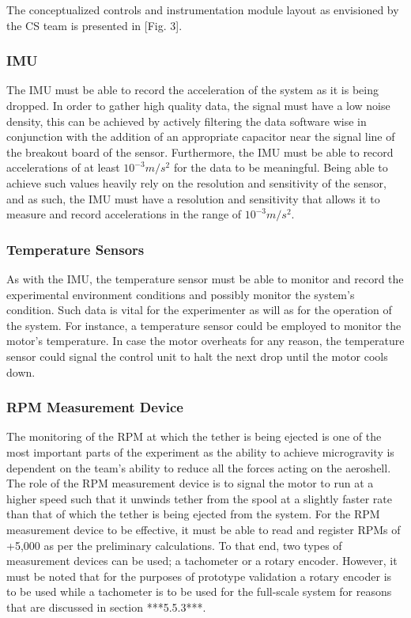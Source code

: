 The conceptualized controls and instrumentation module layout as envisioned by the CS team is presented in [Fig. 3].

\subsubsection{IMU}

\indent\indent The IMU must be able to record the acceleration of the system as it is being dropped. In order to gather high quality data, the signal must have a low noise density, this can be achieved by actively filtering the data software wise in conjunction with the addition of an appropriate capacitor near the signal line of the breakout board of the sensor. Furthermore, the IMU must be able to record accelerations of at least $10^{−3} m/s^{2}$ for the data to be meaningful. Being able to achieve such values heavily rely on the resolution and sensitivity of the sensor, and as such, the IMU must have a resolution and sensitivity that allows it to measure and record accelerations in the range of $10^{−3} m/s^{2}$.

\subsubsection{Temperature Sensors}
\indent\indent As with the IMU, the temperature sensor must be able to monitor and record the experimental environment conditions and possibly monitor the system’s condition. Such data is vital for the experimenter as will as for the operation of the system. For instance, a temperature sensor could be employed to monitor the motor’s temperature. In case the motor overheats for any reason, the temperature sensor could signal the control unit to halt the next drop until the motor cools down.

\subsubsection{RPM Measurement Device}

\indent\indent The monitoring of the RPM at which the tether is being ejected is one of the most important parts of the experiment as the ability to achieve microgravity is dependent on the team’s ability to reduce all the forces acting on the aeroshell. The role of the RPM measurement device is to signal the motor to run at a higher speed such that it unwinds tether from the spool at a slightly faster rate than that of which the tether is being ejected from the system. For the RPM measurement device to be effective, it must be able to read and register RPMs of +5,000 as per the preliminary calculations. To that end, two types of measurement devices can be used; a tachometer or a rotary encoder. However, it must be noted that for the purposes of prototype validation a rotary encoder is to be used while a tachometer is to be used for the full-scale system for reasons that are discussed in section ***5.5.3***.

